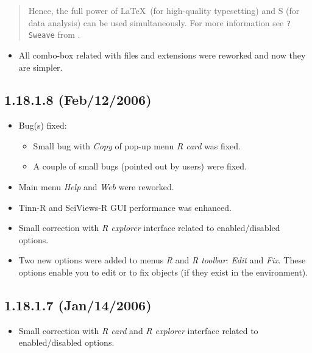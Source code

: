 \begin{footnotesize}
  \begin{quotation}
    Hence, the full power of \LaTeX ~(for high-quality typesetting) and S (for data
    analysis) can be used simultaneously. For more information see \texttt{?Sweave}
    from \RR{}.
  \end{quotation}
\end{footnotesize}

\begin{itemize}
  \item All combo-box related with files and extensions were reworked
    and now they are simpler.
\end{itemize}


\subsection*{1.18.1.8 (Feb/12/2006)}
\begin{itemize}
  \item Bug(s) fixed:
    \begin{itemize}
      \item Small bug with \textit{Copy} of pop-up menu \textit{R card}
        was fixed.
      \item A couple of small bugs (pointed out by users) were fixed.
    \end{itemize}
  \item Main menu \textit{Help} and \textit{Web} were reworked.
  \item Tinn-R and SciViews-R GUI performance was enhanced.
  \item Small correction with \textit{R explorer} interface
    related to enabled/disabled options.
  \item Two new options were added to menus \textit{R} and \textit{R toolbar}:
    \textit{Edit} and \textit{Fix}. These options enable
    you to edit or to fix \RR{} objects (if they exist in the \RR{}
    environment).
\end{itemize}


\subsection*{1.18.1.7 (Jan/14/2006)}
\begin{itemize}
  \item Small correction with \textit{R card} and \textit{R explorer}
    interface related to enabled/disabled options.
\end{itemize}


